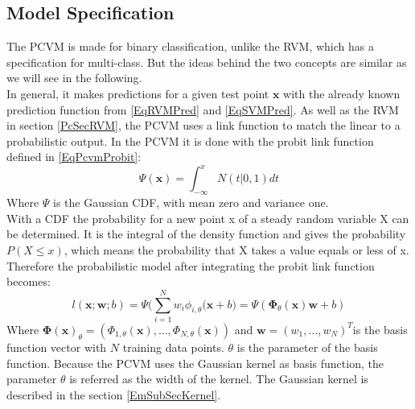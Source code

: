 \subsection{Model Specification}\label{PcSecCM}
The \acs{PCVM} is made for binary classification\cite{Chen.2009}, unlike the \acs{RVM}, which has a specification for multi-class.\cite[p. 220]{Tipping.2001} But the ideas behind the two concepts are similar as we will see in the following.\\
In general, it makes predictions for a given test point $\mathbf{x}$ with the already known prediction function from \eqref{EqRVMPred} and \eqref{EqSVMPred}.\cite{Chen.2009}
As well as the \acs{RVM} in section \ref{PcSecRVM}, the \acs{PCVM} uses a link function to match the linear to a probabilistic output.
In the PCVM it is done with the probit link function defined in \ref{EqPcvmProbit}:\cite{Chen.2014}
\begin{equation}\label{EqPcvmProbit}
\Psi(\mathbf{x}) = \int_{-\infty}^{x}N(t\vert 0,1)dt
\end{equation}
Where $\Psi$ is the Gaussian \ac{CDF}, with mean zero and variance one.\\
With a \ac{CDF} the probability for a new point x of a steady random variable X can be determined.
It is the integral of the density function and gives the probability $P(X \le x)$, which means the probability that X takes a value equals or less of x.\cite[p. 270]{Teschl.2014}\\
Therefore the probabilistic model after integrating the probit link function becomes:
\begin{equation}
l(\mathbf{x};\mathbf{w};b) = \Psi\bigg(\sum_{i=1}^{N}w_i\phi_{i,\theta}(\mathbf{x}+b \bigg) = \Psi(\boldsymbol{\Phi}_\theta(\mathbf{x})\mathbf{w}+b)
\end{equation}
Where $\boldsymbol{\Phi(\mathbf{x})}_\theta=(\Phi_{1,\theta}(\mathbf{x}),\dots,\Phi_{N,\theta}(\mathbf{x}))$ and $\mathbf{w} = (w_1,\dots,w_N)^T$is the basis function vector with $N$ training data points.
$\theta$ is the parameter of the basis function. Because the \ac{PCVM} uses the Gaussian kernel as basis function, the parameter $\theta$ is referred as the width of the kernel.\cite{Chen.2009}
The Gaussian kernel is described in the section \ref{EmSubSecKernel}.
